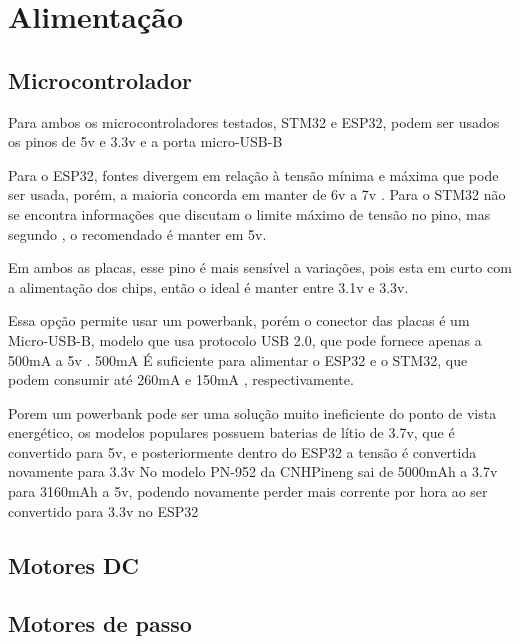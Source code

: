 
\section{Alimentação}


\subsection{Microcontrolador}

Para ambos os microcontroladores testados, STM32 e ESP32,
podem ser usados os pinos de 5v  e 3.3v e a porta micro-USB-B


Para o ESP32, fontes divergem em relação à tensão mínima e máxima 
que pode ser usada, porém, a maioria concorda em manter de
6v a 7v \cite{esp32_reference_power_supply_1,esp32_reference_power_supply_2, esp32_reference_2}.
Para o STM32 não se encontra informações que discutam o limite máximo de tensão no pino, mas segundo \cite{stm_doc},
o recomendado é manter em 5v.

Em ambos as placas, esse pino é mais sensível a variações, pois esta em curto com a alimentação
dos chips, então o ideal é manter entre 3.1v e 3.3v.

Essa opção permite usar um powerbank, porém o conector das placas é um Micro-USB-B,
modelo que usa protocolo USB 2.0, que pode fornece apenas a 500mA a 5v \cite{micro_usb_b}.
500mA É suficiente para alimentar o ESP32 e o STM32, que podem consumir até 260mA \cite{esp_max_current} e 150mA \cite{stm32_datasheet}, respectivamente.

Porem um powerbank pode ser uma solução muito ineficiente do ponto de vista energético,
os modelos populares possuem baterias de lítio de 3.7v, que é convertido para 5v,
e posteriormente dentro do ESP32 a tensão é convertida novamente para 3.3v
No modelo PN-952 da CNHPineng sai de 5000mAh a 3.7v  para 3160mAh a 5v,
podendo novamente perder mais corrente por hora ao ser convertido para 3.3v no ESP32


\subsection{Motores DC}
\lipsum[1]

\subsection{Motores de passo}

